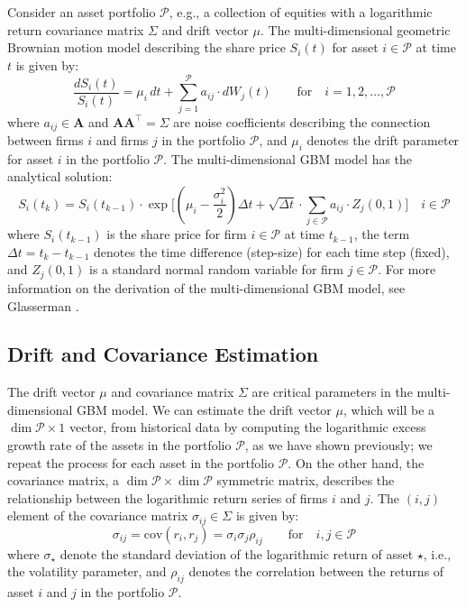\documentclass[11pt]{article}
\theoremstyle{definition}
\begin{document}
Consider an asset portfolio $\mathcal{P}$, e.g., a collection of equities with a logarithmic return covariance matrix $\Sigma$ and drift vector $\mu$.
The multi-dimensional geometric Brownian motion model describing the share price $S_{i}(t)$ for asset $i\in\mathcal{P}$ at time $t$ is given by: 
\begin{equation*}
\frac{dS_{i}\left(t\right)}{S_{i}(t)} = \mu_{i}\,{dt}+\sum_{j=1}^{\mathcal{P}}a_{ij}\cdot{dW_{j}(t)}\qquad\text{for}\quad{i=1,2,\dots,\mathcal{P}}
\end{equation*}
where $a_{ij}\in\mathbf{A}$ and $\mathbf{A}\mathbf{A}^{\top} = \Sigma$ are noise coefficients describing the connection between firms $i$ and firms $j$ in the portfolio $\mathcal{P}$,
and $\mu_{i}$ denotes the drift parameter for asset $i$ in the portfolio $\mathcal{P}$.
The multi-dimensional GBM model has the analytical solution:
\begin{equation*}
S_{i}(t_{k}) = S_{i}(t_{k-1})\cdot\exp\Biggl[\left(\mu_{i}-\frac{\sigma_{i}^{2}}{2}\right)\Delta{t} + \sqrt{\Delta{t}}\cdot\sum_{j\in\mathcal{P}}a_{ij}\cdot{Z_{j}(0,1)}\Biggr]\quad{i\in\mathcal{P}}
\end{equation*}
where $S_{i}(t_{k-1})$ is the share price for firm $i\in\mathcal{P}$ at time $t_{k-1}$,  the term $\Delta{t} = t_{k} - t_{k-1}$ denotes the time difference (step-size) 
for each time step (fixed), and $Z_{j}(0,1)$ is a standard normal random variable for firm $j\in\mathcal{P}$.
For more information on the derivation of the multi-dimensional GBM model, see Glasserman \cite{Glasserman:2004ua}.

\subsection{Drift and Covariance Estimation}
The drift vector $\mu$ and covariance matrix $\Sigma$ are critical parameters in the multi-dimensional GBM model.
We can estimate the drift vector $\mu$, which will be a $\dim\mathcal{P}\times{1}$ vector, from historical data by computing the logarithmic excess growth rate of the assets in the portfolio $\mathcal{P}$, 
as we have shown previously; we repeat the process for each asset in the portfolio $\mathcal{P}$.
On the other hand, the covariance matrix, a $\dim\mathcal{P}\times\dim\mathcal{P}$ symmetric matrix, describes the relationship between the logarithmic return series of firms $i$ and $j$.
The $(i,j)$ element of the covariance matrix $\sigma_{ij}\in\Sigma$ is given by:
\begin{equation*}
    \sigma_{ij} = \text{cov}\left(r_{i},r_{j}\right) = \sigma_{i}\sigma_{j}\rho_{ij}\qquad\text{for}\quad{i,j \in \mathcal{P}}
\end{equation*}
where $\sigma_{\star}$ denote the standard deviation of the logarithmic return of asset $\star$, i.e., the volatility parameter, and $\rho_{ij}$ 
denotes the correlation between the returns of asset $i$ and $j$ in the portfolio $\mathcal{P}$. 
\end{document}
